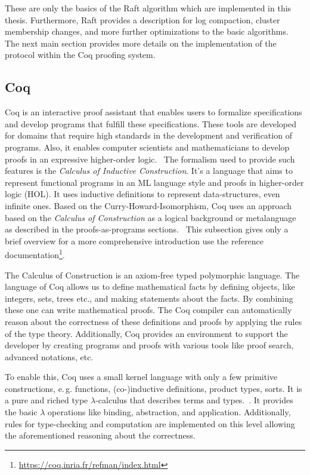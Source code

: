 \vspace{2em}

These are only the basics of the Raft algorithm which are implemented
in this thesis. Furthermore, Raft provides a description for log compaction,
cluster membership changes, and more further optimizations to the basic
algorithms. The next main section provides more details on the
implementation of the protocol within the Coq proofing system.

\subsection{Coq}
Coq is an interactive proof assistant that enables users to formalize
specifications and develop programs that fulfill these specifications.
These tools are developed for domains that require high standards in
the development and verification of programs. Also, it enables computer
scientists and mathematicians to develop proofs in an expressive
higher-order logic.~\cite{the_coq_development_team_2019_2554024}
The formalism used to provide such features is the \textit{Calculus of Inductive
  Construction}. It's a language that aims to represent functional programs
in an ML language style and proofs in higher-order logic (HOL).
It uses inductive definitions to represent data-structures, even infinite
ones. Based on the Curry-Howard-Isomorphism, Coq uses an approach based
on the \textit{Calculus of Construction} as a logical
background or metalanguage as described in the proofs-as-programs
sections.~\cite{the_coq_development_team_2019_2554024,
  paulinmohring:hal-01094195} This subsection gives only a brief overview
for a more comprehensive introduction use the reference documentation\footnote{\url{https://coq.inria.fr/refman/index.html}}.

The Calculus of Construction is an axiom-free typed polymorphic language.
The language of Coq allows us to define mathematical facts by
defining objects, like integers, sets, trees etc., and making statements
about the facts. By combining these one can write mathematical proofs.
The Coq compiler can automatically reason about the correctness of these
definitions and proofs by applying the rules of the type theory.
Additionally, Coq provides an environment to support the developer by
creating programs and proofs with various tools like proof search, advanced
notations, etc.~\cite{paulin2011introduction}

To enable this, Coq uses a small kernel language with only a few
primitive constructions, e.\,g. functions, (co-)inductive definitions,
product types, sorts. It is a pure and riched type $\lambda$-calculus that
describes terms and types.~\cite{paulinmohring:hal-01094195}.
It provides the basic $\lambda$ operations like binding, abstraction,
and application. Additionally, rules for type-checking and computation
are implemented on this level allowing the aforementioned reasoning
about the correctness.~\cite{paulin2011introduction, paulinmohring:hal-01094195}

